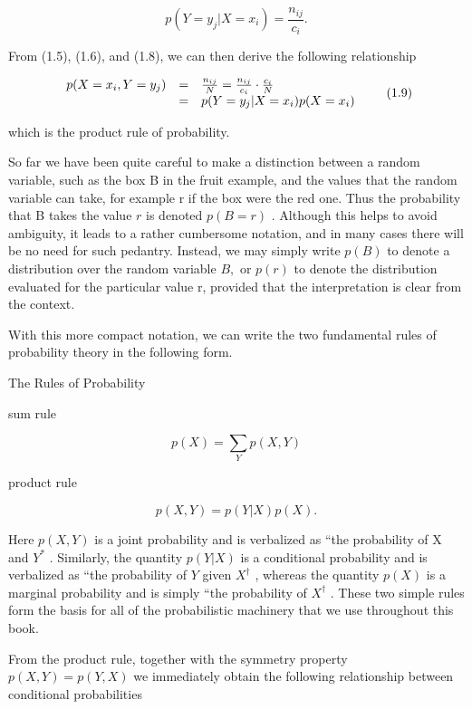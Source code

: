 \documentclass[
  10
]{article}
\begin{document}
\[
p (Y = y _ {j} | X = x _ {i}) = \frac {n _ {i j}}{c _ {i}}.\tag{1.8}
\]

From (1.5), (1.6), and (1.8), we can then derive the following
relationship

\[
\begin{array}{r c l} p (X = x _ {i}, Y = y _ {j}) & = & \frac {n _ {i j}}{N} = \frac {n _ {i j}}{c _ {i}} \cdot \frac {c _ {i}}{N} \\ & = & p (Y = y _ {j} | X = x _ {i}) p (X = x _ {i}) \end{array}\tag{1.9}
\]

which is the product rule of probability.

So far we have been quite careful to make a distinction between a random
variable, such as the box B in the fruit example, and the values that
the random variable can take, for example r if the box were the red one.
Thus the probability that B takes the value \(r\) is denoted
\(p ( B = r )\) . Although this helps to avoid ambiguity, it leads to a
rather cumbersome notation, and in many cases there will be no need for
such pedantry. Instead, we may simply write \(p ( B )\) to denote a
distribution over the random variable \(B ,\) or \(p ( r )\) to denote
the distribution evaluated for the particular value r, provided that the
interpretation is clear from the context.

With this more compact notation, we can write the two fundamental rules
of probability theory in the following form.

The Rules of Probability

sum rule

\[
p (X) = \sum_ {Y} p (X, Y)\tag{1.10}
\]

product rule

\[
p (X, Y) = p (Y | X) p (X).\tag{1.11}
\]

Here \(p ( X , Y )\) is a joint probability and is verbalized as ``the
probability of X and \(Y ^ { \ast }\) . Similarly, the quantity
\(p ( Y | X )\) is a conditional probability and is verbalized as ``the
probability of \(Y\) given \(X ^ { \dag }\) , whereas the quantity
\(p ( X )\) is a marginal probability and is simply ``the probability of
\(X ^ { \dag }\) . These two simple rules form the basis for all of the
probabilistic machinery that we use throughout this book.

From the product rule, together with the symmetry property
\(p ( X , Y ) = p ( Y , X )\) we immediately obtain the following
relationship between conditional probabilities
\end{document}
